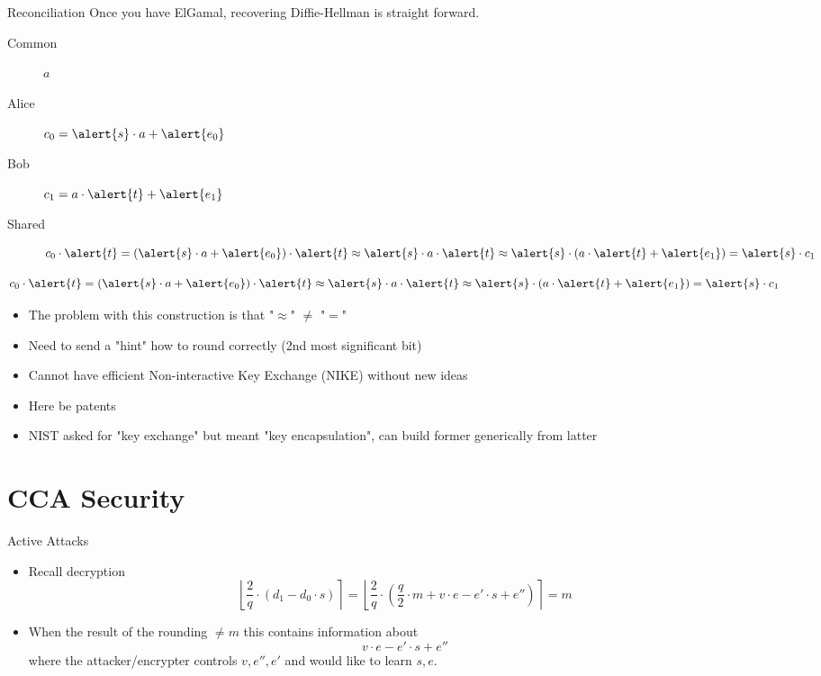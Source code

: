 \documentclass[xcolor=table,10pt,aspectratio=169]{beamer}
\begin{document}
\begin{frame}[allowframebreaks]{Reconciliation}
Once you have ElGamal, recovering Diffie-Hellman is straight forward.

\begin{description}
\item[{Common}] \(a\)
\item[{Alice}] \(c_{0} = \alert{s} \cdot a + \alert{e_{0}}\)
\item[{Bob}] \(c_{1} = a \cdot \alert{t} + \alert{e_{1}}\)
\item[{Shared}] \[c_{0} \cdot \alert{t} = ( \alert{s} \cdot a + \alert{e_{0}})\cdot \alert{t} \approx \alert{s} \cdot a \cdot \alert{t} \approx \alert{s} \cdot (a \cdot \alert{t} + \alert{e_{1}}) = \alert{s} \cdot c_{1} \]
\end{description}

\framebreak

\[c_{0} \cdot \alert{t} = ( \alert{s} \cdot a + \alert{e_{0}})\cdot \alert{t} \approx \alert{s} \cdot a \cdot \alert{t} \approx \alert{s} \cdot (a \cdot \alert{t} + \alert{e_{1}}) = \alert{s} \cdot c_{1} \]

\begin{itemize}
\item The problem with this construction is that "\(\approx\)" \(\neq\) "\(=\)"
\item Need to send a "hint" how to round correctly (2nd most significant bit) 
\item Cannot have efficient Non-interactive Key Exchange (NIKE) without new ideas
\item Here be {\color{lightgray}{dragons} }patents
\item NIST asked for "key exchange" but meant "key encapsulation", can build former generically from latter
\end{itemize}
\end{frame}


\section{CCA Security}
\label{sec:org04774de}

\begin{frame}[label={sec:org66e23b3}]{Active Attacks}
\begin{itemize}
\item Recall decryption
\[\left\lfloor \frac{2}{q} \cdot \left(d_{1} - d_{0} \cdot {s}\right) \right\rceil = \left\lfloor \frac{2}{q} \cdot \left({\frac{q}{2} \cdot m + {v} \cdot {e} - {e'} \cdot {s} + {e''}}\right) \right\rceil = m\]
\item When the result of the rounding \(\neq m\) this contains information about
\[{v} \cdot {e} - {e'} \cdot {s} + {e''}\]
where the attacker/encrypter controls \(v, e'', e'\) and would like to learn \(s,e\).
\end{itemize}
\end{frame}
\end{document}
